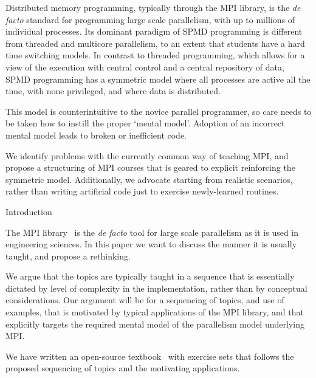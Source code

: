 
Distributed memory programming, typically through the MPI library,
is the \textit{de facto} standard for programming large
scale parallelism, with up to millions of individual processes.  Its
dominant paradigm of \acf{SPMD} programming is different from
threaded and multicore parallelism, to an extent that students have
a hard time switching models.
%
In contrast to threaded programming, which allows
for a view of the execution with central control and 
a central repository of data, SPMD programming
has a symmetric model where all processes are active all the time,
with none privileged, and where data is distributed.

This model is counterintuitive to the novice parallel programmer, so
care needs to be taken how to instill the proper `mental model'.
Adoption of an incorrect mental model leads to broken or inefficient code.

We identify problems with the currently common way of teaching MPI,
and propose a structuring of MPI courses that is geared to explicit
reinforcing the symmetric model. Additionally, we advocate starting
from realistic scenarios, rather than writing artificial code just
to exercise newly-learned routines.

 {Introduction}

The \ac{MPI} library~\cite{mpi-reference,mpi-documents} is the
\textit{de facto} tool for large scale parallelism as it is used in
engineering sciences. In this paper we want to discuss the manner it
is usually taught, and propose a rethinking.

We argue that the topics
are typically taught in a sequence that is essentially dictated by
level of complexity in the implementation, rather than by conceptual considerations.
%
Our argument will be for a sequencing of topics, and use of examples,
that is motivated by typical applications of the \ac{MPI} library, and
that explicitly targets the required mental model of the parallelism
model underlying MPI.

We have written an open-source textbook~\cite{Eijkhout:MPI} with
exercise sets that follows the proposed sequencing of topics and the
motivating applications.

